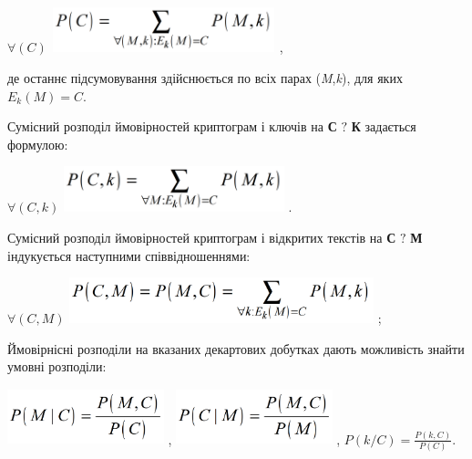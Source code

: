 {\centering
 $\forall (C)$   
\includegraphics[width=2.5583in,height=0.5154in]{crypt-img/crypt-img17.png} ,
\par}

де останнє підсумовування здійснюється по всіх парах
(\textit{M},\textit{k}),\textit{ }для яких  $E_k(M)=C$.

Сумісний розподіл ймовірностей  криптограм і ключів  на \textbf{С} $?$
\textbf{К} задається формулою:

{\centering
 $\forall (C,k)$    
\includegraphics[width=2.5201in,height=0.5209in]{crypt-img/crypt-img18.png} .
\par}

Сумісний розподіл ймовірностей  криптограм і відкритих текстів на  \textbf{С}
$?$ \textbf{М}  індукується наступними співвідношеннями:


\bigskip

{\centering
 $\forall (C,M)$   
\includegraphics[width=3.478in,height=0.5209in]{crypt-img/crypt-img19.png} ;
\par}

Ймовірнісні розподіли на вказаних декартових добутках дають можливість знайти
умовні розподіли:

{\centering
 \includegraphics[width=1.7902in,height=0.6354in]{crypt-img/crypt-img20.png} ,  
\includegraphics[width=1.7874in,height=0.6335in]{crypt-img/crypt-img21.png} ,  
$P(k/C)=\frac{P(k,C)}{P(C)}$.
\par}


\bigskip


